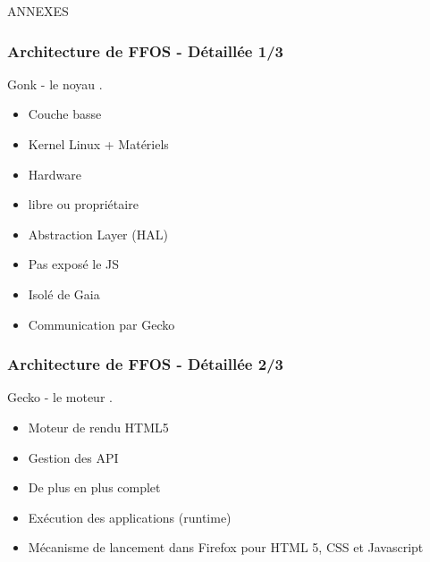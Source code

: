\documentclass{beamer}
\begin{document}
\begin{frame}
\begin{center}
\Huge{ANNEXES}
\end{center}
\end{frame}

\begin{frame}
\frametitle{Architecture de FFOS - Détaillée 1/3}
\begin{block}{Gonk - le noyau}
.
\begin{itemize}
\item Couche basse
\item Kernel Linux + Matériels
\item Hardware
\item libre ou propriétaire
\item Abstraction Layer (HAL)
\item Pas exposé le JS
\item Isolé de Gaia
\item Communication par Gecko
\end{itemize}
\end{block}
\end{frame}

\begin{frame}
\frametitle{Architecture de FFOS - Détaillée 2/3}
\begin{block}{Gecko - le moteur}
.
\begin{itemize}
\item Moteur de rendu HTML5
\item Gestion des API
\item De plus en plus complet
\item Exécution des applications (runtime)
\item Mécanisme de lancement dans Firefox pour HTML 5, CSS et Javascript
\end{itemize}
\end{block}
\end{frame}
\end{document}
